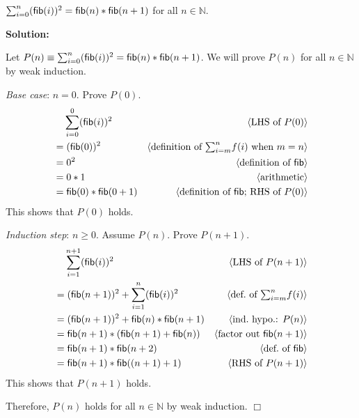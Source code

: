 \documentclass[11pt,fleqn]{article}
\newcommand{\sglsp}{\ }
\newcommand{\mname}[1]{\mbox{\sf #1}}
\newenvironment{proof}{\par\noindent{\bf Proof\sglsp}}{\hfill$\Box$}
\newcommand{\pnote}[1]{{\langle \text{#1} \rangle}}
\begin{document}
\medskip

    \item $\sum^{n}_{i=0}(\mname{fib}(i))^2 = \mname{fib}(n) *
      \mname{fib}(n+1)$ for all $n \in \mathbb{N}$.

\medskip

\textbf{Solution:}

\medskip

\begin{proof}
Let $P(n) \equiv \sum^{n}_{i=0}(\mname{fib}(i))^2 = \mname{fib}(n) *
\mname{fib}(n+1)$.  We will prove $P(n)$ for all $n \in \mathbb{N}$
by weak induction.
   	
\medskip
   	
\emph{Base case}: $n = 0$. Prove $P(0)$.
\begin{align*}
  &\phantom{{}=} \sum^{0}_{i=0}(\mname{fib}(i))^2 & \pnote{LHS of $P(0)$}\\
  &= (\mname{fib}(0))^2 & \pnote{definition of $\textstyle{\sum}_{i=m}^{n}f(i)$ when $m=n$}\\
  &= 0^2 & \pnote{definition of \mname{fib}}\\
  &= 0 * 1 & \pnote{arithmetic}\\
  &= \mname{fib}(0) * \mname{fib}(0 + 1)& \pnote{definition of \mname{fib}; RHS of $P(0)$}
\end{align*}
This shows that $P(0)$ holds.
	
\medskip
   	
\emph{Induction step}: $n \ge 0$.  Assume $P(n)$.  Prove $P(n + 1)$.
\begin{align*}
  &\phantom{{}=} \sum^{n+1}_{i=1}(\mname{fib}(i))^2 
    & \pnote{LHS of $P(n + 1)$}\\
  &= (\mname{fib}(n+1))^2 + \sum^{n}_{i=1}(\mname{fib}(i))^2
    & \pnote{def.\ of $\textstyle{\sum}_{i=m}^{n}f(i)$}\\
  &= (\mname{fib}(n+1))^2 + \mname{fib}(n) * \mname{fib}(n+1)
    & \pnote{ind.\  hypo.: $P(n)$}\\
  &=  \mname{fib}(n+1)*(\mname{fib}(n+1)+\mname{fib}(n))
    & \pnote{factor out $\mname{fib}(n+1)$}\\
  &= \mname{fib}(n+1)*\mname{fib}(n + 2)
    & \pnote{def.\ of $\mname{fib}$}\\
  &= \mname{fib}(n+1)*\mname{fib}((n + 1) + 1)
    & \pnote{RHS of $P(n + 1)$}\\
\end{align*}
This shows that $P(n + 1)$ holds.

\medskip

Therefore, $P(n)$ holds for all $n \in \mathbb{N}$ by weak induction.
\end{proof}
\end{document}
